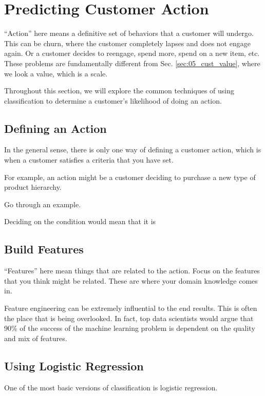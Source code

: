 \section{Predicting Customer Action}

``Action'' here means a definitive set of behaviors that a customer will undergo.  This can be churn, where the customer completely lapses and does not engage again.  Or a customer decides to reengage, spend more, spend on a new item, etc.  These problems are fundamentally different from Sec. \ref{sec:05_cust_value}, where we look a value, which is a scale.  

Throughout this section, we will explore the common techniques of using classification to determine a customer's likelihood of doing an action.  

\subsection{Defining an Action}

In the general sense, there is only one way of defining a customer action, which is when a customer satisfies a criteria that you have set.  

For example, an action might be a customer deciding to purchase a new type of product hierarchy.  

Go through an example.  

Deciding on the condition would mean that it is 

\subsection{Build Features}

``Features'' here mean things that are related to the action.  Focus on the features that you think might be related.  These are where your domain knowledge comes in.  

Feature engineering can be extremely influential to the end results.  This is often the place that is being overlooked.  In fact, top data scientists would argue that 90\% of the success of the machine learning problem is dependent on the quality and mix of features.  

\subsection{Using Logistic Regression}

One of the most basic versions of classification is logistic regression.  



\newpage 